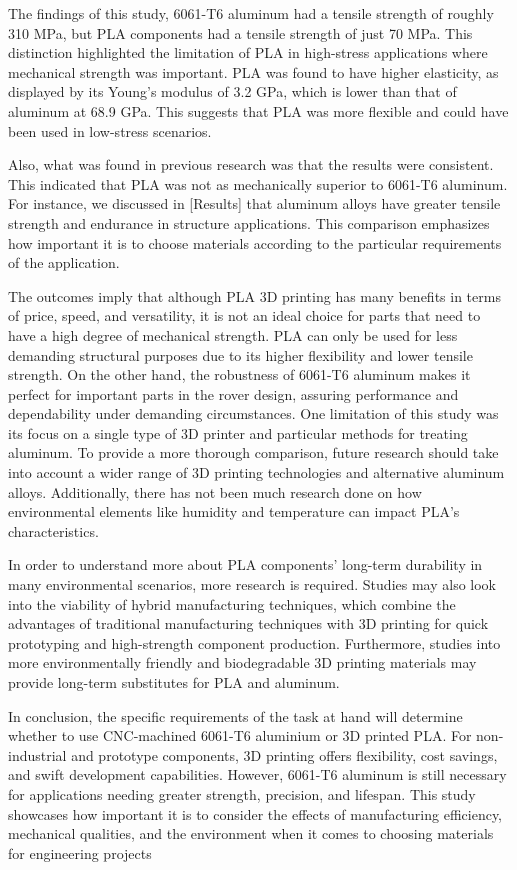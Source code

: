 The findings of this study, 6061-T6 aluminum had a tensile strength of roughly 310 MPa, but PLA
components had a tensile strength of just 70 MPa. This distinction highlighted the limitation of PLA in
high-stress applications where mechanical strength was important. PLA was found to have higher
elasticity, as displayed by its Young’s modulus of 3.2 GPa, which is lower than that of aluminum at 68.9
GPa. This suggests that PLA was more flexible and could have been used in low-stress scenarios.

Also, what was found in previous research was that the results were consistent. This indicated that PLA
was not as mechanically superior to 6061-T6 aluminum. For instance, we discussed in [Results] that
aluminum alloys have greater tensile strength and endurance in structure applications. This comparison
emphasizes how important it is to choose materials according to the particular requirements of the
application.

The outcomes imply that although PLA 3D printing has many benefits in terms of price, speed, and
versatility, it is not an ideal choice for parts that need to have a high degree of mechanical strength. PLA
can only be used for less demanding structural purposes due to its higher flexibility and lower tensile
strength. On the other hand, the robustness of 6061-T6 aluminum makes it perfect for important parts in
the rover design, assuring performance and dependability under demanding circumstances.
One limitation of this study was its focus on a single type of 3D printer and particular methods for treating
aluminum. To provide a more thorough comparison, future research should take into account a wider
range of 3D printing technologies and alternative aluminum alloys. Additionally, there has not been much
research done on how environmental elements like humidity and temperature can impact PLA’s
characteristics.

In order to understand more about PLA components’ long-term durability in many environmental
scenarios, more research is required. Studies may also look into the viability of hybrid manufacturing
techniques, which combine the advantages of traditional manufacturing techniques with 3D printing for
quick prototyping and high-strength component production. Furthermore, studies into more
environmentally friendly and biodegradable 3D printing materials may provide long-term substitutes for
PLA and aluminum.

In conclusion, the specific requirements of the task at hand will determine whether to use CNC-machined
6061-T6 aluminium or 3D printed PLA. For non-industrial and prototype components, 3D printing offers
flexibility, cost savings, and swift development capabilities. However, 6061-T6 aluminum is still necessary
for applications needing greater strength, precision, and lifespan. This study showcases how important it is
to consider the effects of manufacturing efficiency, mechanical qualities, and the environment when it
comes to choosing materials for engineering projects